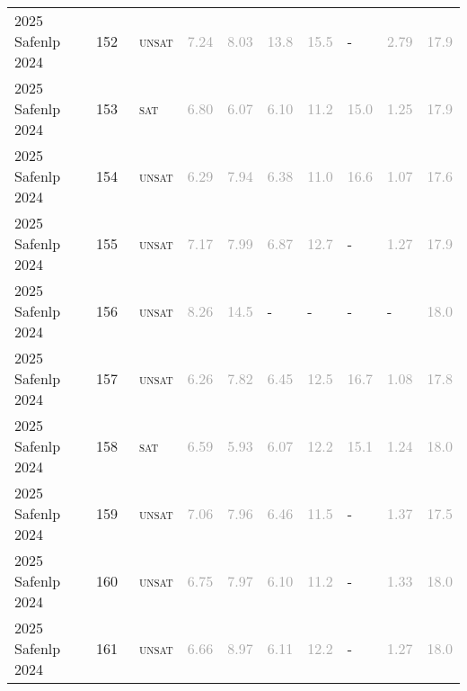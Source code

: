 \begin{center}
{\begin{longtable}{@{}llllllllll@{}}
2025 Safenlp 2024 & 152 & ~\textsc{unsat} & \textcolor{darkgray}{7.24} & \textcolor{darkgray}{8.03} & \textcolor{darkgray}{13.8} & \textcolor{darkgray}{15.5} & - & \textcolor{darkgray}{2.79} & \textcolor{darkgray}{17.9} \\
2025 Safenlp 2024 & 153 & ~\textsc{sat} & \textcolor{darkgray}{6.80} & \textcolor{darkgray}{6.07} & \textcolor{darkgray}{6.10} & \textcolor{darkgray}{11.2} & \textcolor{darkgray}{15.0} & \textcolor{darkgray}{1.25} & \textcolor{darkgray}{17.9} \\
2025 Safenlp 2024 & 154 & ~\textsc{unsat} & \textcolor{darkgray}{6.29} & \textcolor{darkgray}{7.94} & \textcolor{darkgray}{6.38} & \textcolor{darkgray}{11.0} & \textcolor{darkgray}{16.6} & \textcolor{darkgray}{1.07} & \textcolor{darkgray}{17.6} \\
2025 Safenlp 2024 & 155 & ~\textsc{unsat} & \textcolor{darkgray}{7.17} & \textcolor{darkgray}{7.99} & \textcolor{darkgray}{6.87} & \textcolor{darkgray}{12.7} & - & \textcolor{darkgray}{1.27} & \textcolor{darkgray}{17.9} \\
2025 Safenlp 2024 & 156 & ~\textsc{unsat} & \textcolor{darkgray}{8.26} & \textcolor{darkgray}{14.5} & - & - & - & - & \textcolor{darkgray}{18.0} \\
2025 Safenlp 2024 & 157 & ~\textsc{unsat} & \textcolor{darkgray}{6.26} & \textcolor{darkgray}{7.82} & \textcolor{darkgray}{6.45} & \textcolor{darkgray}{12.5} & \textcolor{darkgray}{16.7} & \textcolor{darkgray}{1.08} & \textcolor{darkgray}{17.8} \\
2025 Safenlp 2024 & 158 & ~\textsc{sat} & \textcolor{darkgray}{6.59} & \textcolor{darkgray}{5.93} & \textcolor{darkgray}{6.07} & \textcolor{darkgray}{12.2} & \textcolor{darkgray}{15.1} & \textcolor{darkgray}{1.24} & \textcolor{darkgray}{18.0} \\
2025 Safenlp 2024 & 159 & ~\textsc{unsat} & \textcolor{darkgray}{7.06} & \textcolor{darkgray}{7.96} & \textcolor{darkgray}{6.46} & \textcolor{darkgray}{11.5} & - & \textcolor{darkgray}{1.37} & \textcolor{darkgray}{17.5} \\
2025 Safenlp 2024 & 160 & ~\textsc{unsat} & \textcolor{darkgray}{6.75} & \textcolor{darkgray}{7.97} & \textcolor{darkgray}{6.10} & \textcolor{darkgray}{11.2} & - & \textcolor{darkgray}{1.33} & \textcolor{darkgray}{18.0} \\
2025 Safenlp 2024 & 161 & ~\textsc{unsat} & \textcolor{darkgray}{6.66} & \textcolor{darkgray}{8.97} & \textcolor{darkgray}{6.11} & \textcolor{darkgray}{12.2} & - & \textcolor{darkgray}{1.27} & \textcolor{darkgray}{18.0} \\

\end{longtable}}
\end{center}
